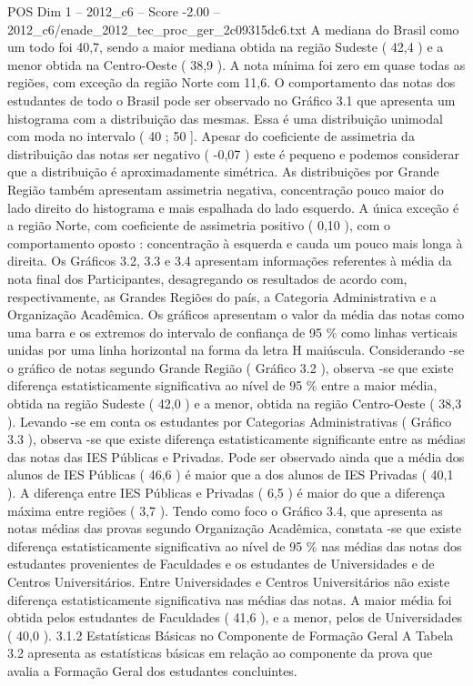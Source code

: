 \begin{textsample}{POS Dim 1 – 2012\_c6 – Score -2.00 – 2012\_c6/enade\_2012\_tec\_proc\_ger\_2c09315dc6.txt}
A mediana do Brasil como um todo foi 40,7, sendo a maior mediana obtida na região Sudeste ( 42,4 ) e a menor obtida na Centro-Oeste ( 38,9 ).
A nota mínima foi zero em quase todas as regiões, com exceção da região Norte com 11,6.
O comportamento das notas dos estudantes de todo o Brasil pode ser observado no Gráfico 3.1 que apresenta um histograma com a distribuição das mesmas.
Essa é uma distribuição unimodal com moda no intervalo ( 40 ; 50 ].
Apesar do coeficiente de assimetria da distribuição das notas ser negativo ( -0,07 ) este é pequeno e podemos considerar que a distribuição é aproximadamente simétrica.
As distribuições por Grande Região também apresentam assimetria negativa, concentração pouco maior do lado direito do histograma e mais espalhada do lado esquerdo.
A única exceção é a região Norte, com coeficiente de assimetria positivo ( 0,10 ), com o comportamento oposto : concentração à esquerda e cauda um pouco mais longa à direita.
Os Gráficos 3.2, 3.3 e 3.4 apresentam informações referentes à média da nota final dos Participantes, desagregando os resultados de acordo com, respectivamente, as Grandes Regiões do país, a Categoria Administrativa e a Organização Acadêmica.
Os gráficos apresentam o valor da média das notas como uma barra e os extremos do intervalo de confiança de 95 \% como linhas verticais unidas por uma linha horizontal na forma da letra H maiúscula.
Considerando -se o gráfico de notas segundo Grande Região ( Gráfico 3.2 ), observa -se que existe diferença estatisticamente significativa ao nível de 95 \% entre a maior média, obtida na região Sudeste ( 42,0 ) e a menor, obtida na região Centro-Oeste ( 38,3 ).
Levando -se em conta os estudantes por Categorias Administrativas ( Gráfico 3.3 ), observa -se que existe diferença estatisticamente significante entre as médias das notas das IES Públicas e Privadas.
Pode ser observado ainda que a média dos alunos de IES Públicas ( 46,6 ) é maior que a dos alunos de IES Privadas ( 40,1 ).
A diferença entre IES Públicas e Privadas ( 6,5 ) é maior do que a diferença máxima entre regiões ( 3,7 ).
Tendo como foco o Gráfico 3.4, que apresenta as notas médias das provas segundo Organização Acadêmica, constata -se que existe diferença estatisticamente significativa ao nível de 95 \% nas médias das notas dos estudantes provenientes de Faculdades e os estudantes de Universidades e de Centros Universitários.
Entre Universidades e Centros Universitários não existe diferença estatisticamente significativa nas médias das notas.
A maior média foi obtida pelos estudantes de Faculdades ( 41,6 ), e a menor, pelos de Universidades ( 40,0 ). 3.1.2 Estatísticas Básicas no Componente de Formação Geral A Tabela 3.2 apresenta as estatísticas básicas em relação ao componente da prova que avalia a Formação Geral dos estudantes concluintes.

\end{textsample}
